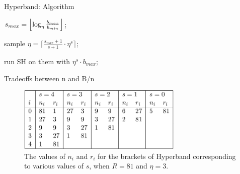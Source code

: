 \begin{frame}{Hyperband: Algorithm}
\begin{minipage}{0.75\textwidth}
\begin{algorithm}[H]
    \LinesNumbered
    \SetAlgoLined
    \setcounter{AlgoLine}{0}
    \DeclarePairedDelimiter\ceil{\lceil}{\rceil}
    \DeclarePairedDelimiter\floor{\lfloor}{\rfloor}
    
    
    $s_{max}=\floor*{\log_{\eta}\frac{b_{max}}{b_{min}}}$;\
    
    {
        sample $\eta=\lceil\frac{s_{max}+1}{s+1} \cdot\eta^{s}\rceil$;\
        
        run SH on them with $\eta^{s}\cdot b_{max}$;\
    }
 
        
    
    \caption{Pseudocode for Hyperband using SuccessiveHalving (SH) as a subroutine}
\end{algorithm}
\end{minipage}
\end{frame}
\begin{frame}{Tradeoffs between n and B/n}
\vspace{2em}
\begin{figure}
    \centering
    \includegraphics[width=0.7\textwidth]{images/hyperband/Hyperband_Table1-1.png}
    \caption{The values of $n_i$ and $r_i$ for the brackets of Hyperband corresponding to various values of $s$, when $R = 81$ and $\eta = 3$.}
\end{figure}

    
\end{frame}

